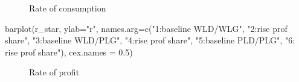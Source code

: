 \documentclass[
  letterpaper,
  DIV=11,
  numbers=noendperiod]{scrreprt}
\newenvironment{Shaded}{\begin{snugshade}}{\end{snugshade}}
\newcommand{\AttributeTok}[1]{\textcolor[rgb]{0.40,0.45,0.13}{#1}}
\newcommand{\FloatTok}[1]{\textcolor[rgb]{0.68,0.00,0.00}{#1}}
\newcommand{\FunctionTok}[1]{\textcolor[rgb]{0.28,0.35,0.67}{#1}}
\newcommand{\NormalTok}[1]{\textcolor[rgb]{0.00,0.23,0.31}{#1}}
\newcommand{\StringTok}[1]{\textcolor[rgb]{0.13,0.47,0.30}{#1}}
\begin{document}
\begin{figure}[H]


\caption{\label{fig-consumption-pkdg}Rate of consumption}

\end{figure}%

\begin{Shaded}
\begin{Highlighting}[]
\FunctionTok{barplot}\NormalTok{(r\_star, }\AttributeTok{ylab=}\StringTok{"r"}\NormalTok{, }\AttributeTok{names.arg=}\FunctionTok{c}\NormalTok{(}\StringTok{"1:baseline WLD/WLG"}\NormalTok{, }\StringTok{"2:rise prof share"}\NormalTok{, }\StringTok{"3:baseline WLD/PLG"}\NormalTok{,}
                                     \StringTok{"4:rise prof share"}\NormalTok{, }
                                     \StringTok{"5:baseline PLD/PLG"}\NormalTok{, }\StringTok{"6: rise prof share"}\NormalTok{), }\AttributeTok{cex.names =} \FloatTok{0.5}\NormalTok{)}
\end{Highlighting}
\end{Shaded}

\begin{figure}[H]


\caption{\label{fig-profit-rate-pkdg}Rate of profit}

\end{figure}%
\end{document}
